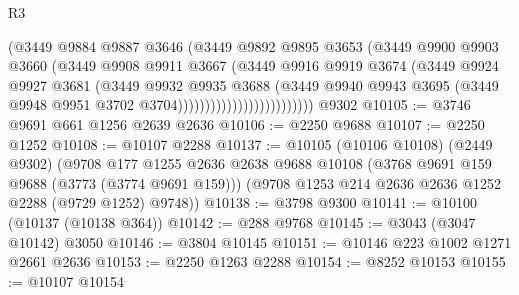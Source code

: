 \begin{lexlean}{R3}
\begin{coremodule}
                                    (@3449
                                      @9884
                                      @9887
                                      @3646
                                      (@3449
                                        @9892
                                        @9895
                                        @3653
                                        (@3449
                                          @9900
                                          @9903
                                          @3660
                                          (@3449
                                            @9908
                                            @9911
                                            @3667
                                            (@3449
                                              @9916
                                              @9919
                                              @3674
                                              (@3449
                                                @9924
                                                @9927
                                                @3681
                                                (@3449
                                                  @9932
                                                  @9935
                                                  @3688
                                                  (@3449
                                                    @9940
                                                    @9943
                                                    @3695
                                                    (@3449
                                                      @9948
                                                      @9951
                                                      @3702
                                                      @3704)))))))))))))))))))))))))
    @9302
@10105 := @3746 @9691 @661 @1256 @2639 @2636
@10106 := @2250 @9688
@10107 := @2250 @1252
@10108 := @10107 @2288
@10137 := @10105
    (@10106 @10108)
    (@2449 @9302)
    (@9708
      @177
      @1255
      @2636
      @2638
      @9688
      @10108
      (@3768 @9691 @159 @9688 (@3773 (@3774 @9691 @159)))
      (@9708 @1253 @214 @2636 @2636 @1252 @2288 (@9729 @1252) @9748))
@10138 := @3798 @9300
@10141 := @10100 (@10137 (@10138 @364))
@10142 := @288 @9768
@10145 := @3043 (@3047 @10142) @3050
@10146 := @3804 @10145
@10151 := @10146 @223 @1002 @1271 @2661 @2636
@10153 := @2250 @1263 @2288
@10154 := @8252 @10153
@10155 := @10107 @10154

\end{coremodule}
\end{lexlean}
